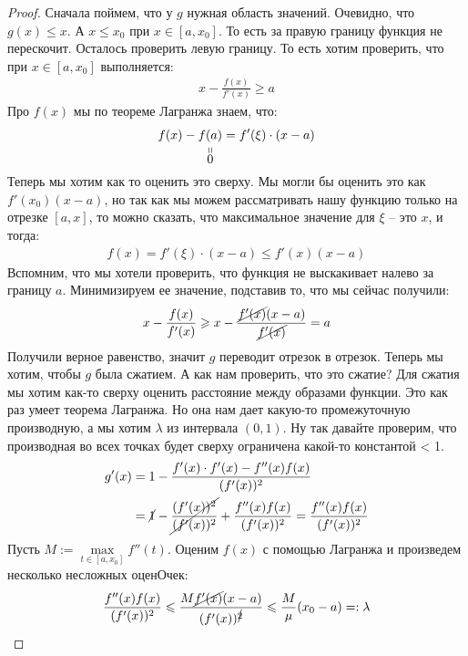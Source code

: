 \begin{proof}
    Сначала поймем, что у $g$ нужная область значений. 
    Очевидно, что $g(x) \leqslant x$. А $x \leqslant x_0$ при $x \in [a, x_0]$. 
    То есть за правую границу функция не перескочит. Осталось проверить левую границу. То есть хотим проверить, что при $x \in [a, x_0]$ выполняется:
    \begin{gather*}
        x - \frac{f(x)}{f'(x)} \geqslant a
    \end{gather*}
    Про $f(x)$ мы по теореме Лагранжа знаем, что:
    \begin{gather*}
        f(x) - \stackbelow{f(a)}{0} = f'(\xi)\cdot(x - a)
    \end{gather*}
    Теперь мы хотим как то оценить это сверху. 
    Мы могли бы оценить это как $f'(x_0)(x - a)$, но так как мы можем рассматривать 
    нашу функцию только на отрезке $[a, x]$, то можно сказать, что максимальное значение для $\xi$ -- это $x$, и тогда: 
    \begin{gather*}
        f(x) = f'(\xi)\cdot(x - a) \leqslant f'(x)(x-a)
    \end{gather*}
    Вспомним, что мы хотели проверить, что функция не выскакивает налево за границу $a$. 
    Минимизируем ее значение, подставив то, что мы сейчас получили:
    \begin{gather*}
        x - \frac{f(x)}{f'(x)} \geqslant x - \frac{\cancel{f'(x)}(x - a)}{\cancel{f'(x)}} = a
    \end{gather*}
    Получили верное равенство, значит $g$ переводит отрезок в отрезок. 
    Теперь мы хотим, чтобы $g$ была сжатием. А как нам проверить, что это сжатие? 
    Для сжатия мы хотим как-то сверху оценить расстояние между образами функции. 
    Это как раз умеет теорема Лагранжа. Но она нам дает какую-то промежуточную производную, 
    а мы хотим $\lambda$ из интервала $(0, 1)$. Ну так давайте проверим, что производная во 
    всех точках будет сверху ограничена какой-то константой < 1. 
    \begin{align*}
        g'(x) &= 1 - \frac{f'(x) \cdot f'(x) - f''(x)f(x)}{(f'(x))^2} \\
        &= \cancel{1} - \cancel{\frac{(f'(x))^2}{(f'(x))^2}} + \frac{f''(x)f(x)}{(f'(x))^2} = \frac{f''(x)f(x)}{(f'(x))^2}
    \end{align*}
    Пусть $M:= \max\limits_{t \in [a, x_0]} f''(t)$. Оценим $f(x)$ с помощью Лагранжа и произведем несколько несложных оценОчек:
    \begin{gather*}
        \frac{f''(x)f(x)}{(f'(x))^2} \leqslant \frac{M \cancel{f'(x)}(x-a)}{(f'(x))^{\cancel{2}}} \leqslant \frac{M}{\mu} (x_0 - a) =: \lambda 

\end{gather*}
\end{proof}
